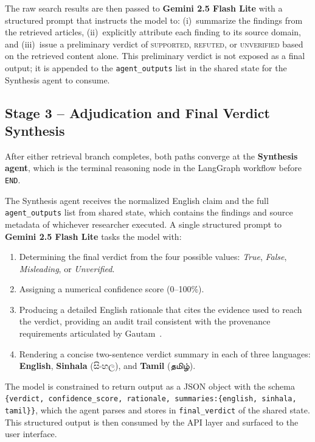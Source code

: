 \documentclass[12pt,a4paper]{article}
\begin{document}
The raw search results are then passed to \textbf{Gemini 2.5 Flash Lite}
with a structured prompt that instructs the model to: (i)~summarize the
findings from the retrieved articles, (ii)~explicitly attribute each
finding to its source domain, and (iii)~issue a preliminary verdict of
\textsc{supported}, \textsc{refuted}, or \textsc{unverified} based on the
retrieved content alone. This preliminary verdict is not exposed as a final
output; it is appended to the \texttt{agent\_outputs} list in the shared
state for the Synthesis agent to consume.

\subsection{Stage 3 -- Adjudication and Final Verdict Synthesis}
\label{subsec:synthesis}

After either retrieval branch completes, both paths converge at the
\textbf{Synthesis agent}, which is the terminal reasoning node in the
LangGraph workflow before \texttt{END}.

The Synthesis agent receives the normalized English claim and the full
\texttt{agent\_outputs} list from shared state, which contains the findings
and source metadata of whichever researcher executed. A single structured
prompt to \textbf{Gemini 2.5 Flash Lite} tasks the model with:

\begin{enumerate}
  \item Determining the final verdict from the four possible values:
        \textit{True}, \textit{False}, \textit{Misleading}, or
        \textit{Unverified}.
  \item Assigning a numerical confidence score (0--100\%).
  \item Producing a detailed English rationale that cites the evidence used
        to reach the verdict, providing an audit trail consistent with the
        provenance requirements articulated by Gautam~\cite{gautam}.
  \item Rendering a concise two-sentence verdict summary in each of three
        languages: \textbf{English}, \textbf{Sinhala} (සිංහල), and
        \textbf{Tamil} (தமிழ்).
\end{enumerate}

The model is constrained to return output as a JSON object with the schema
\texttt{\{verdict, confidence\_score, rationale, summaries:\{english,
sinhala, tamil\}\}}, which the agent parses and stores in
\texttt{final\_verdict} of the shared state. This structured output is then
consumed by the API layer and surfaced to the user interface.
\end{document}

